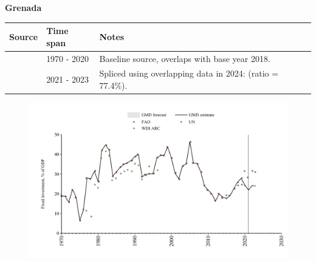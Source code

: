 \documentclass[12pt,a4paper,landscape]{article}
\begin{document}
\begin{adjustbox}{max totalsize={\paperwidth}{\paperheight},center}
\begin{minipage}[t][\textheight][t]{\textwidth}
\vspace*{0.5cm}
{}
\begin{center}
{\Large\bfseries Grenada}
\end{center}
\vspace{0.5cm}
\begin{table}[H]
\centering
\small
\begin{tabular}{|l|l|l|}
\hline
\textbf{Source} & \textbf{Time span} & \textbf{Notes} \\
\hline
\rowcolor{white}\cite{UN}& 1970 - 2020 &Baseline source, overlaps with base year 2018.\\
\rowcolor{lightgray}\cite{FAO}& 2021 - 2023 &Spliced using overlapping data in 2024: (ratio = 77.4\%).\\
\hline
\end{tabular}
\end{table}
\begin{figure}[H]
\centering
\includegraphics[width=\textwidth,height=0.6\textheight,keepaspectratio]{graphs/GRD_finv_GDP.pdf}
\end{figure}
\end{minipage}
\end{adjustbox}
\end{document}
